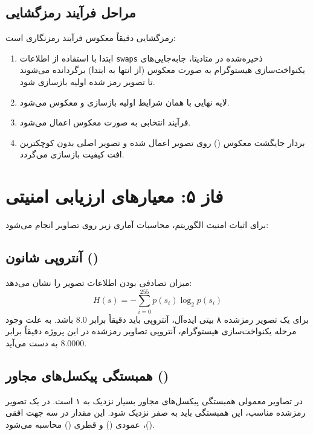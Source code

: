 \subsection{مراحل فرآیند رمزگشایی}
رمزگشایی دقیقاً معکوس فرآیند رمزنگاری است:
\begin{enumerate}
    \item ابتدا با استفاده از اطلاعات \texttt{swaps} ذخیره‌شده در متادیتا، جابه‌جایی‌های یکنواخت‌سازی هیستوگرام به صورت معکوس (از انتها به ابتدا) برگردانده می‌شوند تا تصویر رمز شده اولیه بازسازی شود.
    \item لایه  نهایی با همان شرایط اولیه بازسازی و معکوس می‌شود.
    \item فرآیند  انتخابی  به صورت معکوس اعمال می‌شود.
    \item بردار جایگشت معکوس () روی تصویر اعمال شده و تصویر اصلی بدون کوچکترین افت کیفیت بازسازی می‌گردد.
\end{enumerate}

\section{فاز ۵: معیارهای ارزیابی امنیتی}
برای اثبات امنیت الگوریتم، محاسبات آماری زیر روی تصاویر انجام می‌شود:

\subsection{آنتروپی شانون ()}
میزان تصادفی بودن اطلاعات تصویر را نشان می‌دهد:
\begin{equation}
H(s) = -\sum_{i=0}^{255} p(s_i) \log_2 p(s_i)
\end{equation}
برای یک تصویر رمزشده ۸ بیتی ایده‌آل، آنتروپی باید دقیقاً برابر $8.0$ باشد. به علت وجود مرحله یکنواخت‌سازی هیستوگرام، آنتروپی تصاویر رمزشده در این پروژه دقیقاً برابر $8.0000$ به دست می‌آید.

\subsection{همبستگی پیکسل‌های مجاور ()}
در تصاویر معمولی همبستگی پیکسل‌های مجاور بسیار نزدیک به ۱ است. در یک تصویر رمزشده مناسب، این همبستگی باید به صفر نزدیک شود. این مقدار در سه جهت افقی ()، عمودی () و قطری () محاسبه می‌شود.

